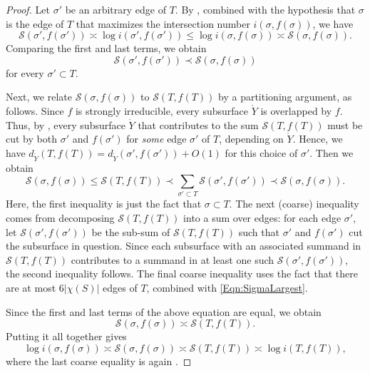 \documentclass[10pt,a4paper]{amsart}
\newcommand{\mc}{\mathcal}
\newcommand{\mr}{\mathring}
\begin{document}
\begin{proof}
Let $\sigma'$ be an arbitrary edge of $T$. By , combined with the hypothesis that $\sigma$ is the edge of $T$ that maximizes the intersection number $i(\sigma, f(\sigma))$, we have
\[
\mc S(\sigma', f(\sigma'))  \asymp  \log i(\sigma', f(\sigma')) \leq 
 \log i(\sigma, f(\sigma)) \asymp  \mc S(\sigma, f(\sigma)).
\]
Comparing the first and last terms, we obtain
\begin{equation}\label{Eqn:SigmaLargest}
\mc S(\sigma', f(\sigma')) \prec \mc S(\sigma, f(\sigma))
\end{equation}
for every $\sigma' \subset T$. 


Next, we relate $\mc S (\sigma, f(\sigma))$ to $\mc S(T, f(T))$ by a partitioning argument, as follows. 
Since $f$ is strongly irreducible, every subsurface $\mr Y$ is overlapped by $f$.
Thus, by  , 
every subsurface $\mr Y$ that contributes to the sum $\mc S(T, f(T))$ must be cut by both $\sigma'$ and $f(\sigma')$ for \emph{some} edge $\sigma'$ of $T$, depending on $\mr Y$. Hence, we have $d_{\mr Y}(T, f(T)) = d_{\mr Y}(\sigma', f(\sigma')) + O(1)$ for 
this choice of $\sigma'$.
Then we obtain
\[
\mc S(\sigma, f(\sigma)) \leq \mc S(T, f(T)) \prec \sum_{\sigma' \subset T} \mc S(\sigma', f(\sigma'))
\prec \mc S(\sigma, f(\sigma)).
\]
Here, the first inequality is just the fact that $\sigma \subset T$. The next (coarse) inequality comes from decomposing $\mc S(T, f(T))$ into a sum over edges: for each edge $\sigma'$, let $\mc S(\sigma', f(\sigma'))$ be the sub-sum of $\mc S(T, f(T))$ such that $\sigma'$ and $f(\sigma')$ cut the subsurface in question. Since each subsurface with an associated summand in $\mc S(T, f(T))$ contributes to a summand in at least one such $\mc S(\sigma', f(\sigma'))$, the second inequality follows. The final coarse inequality uses the fact that there are at most $6|\chi(S)|$ edges of $T$, 
combined with \eqref{Eqn:SigmaLargest}.

Since the first and last terms of the above equation are equal, we obtain
\[
\mc S(\sigma, f(\sigma)) \asymp \mc S(T, f(T)).
\]
Putting it all together gives
\[
\log i(\sigma, f(\sigma)) \asymp \mc S(\sigma, f(\sigma)) \asymp \mc S(T, f(T)) \asymp \log i(T, f(T)), 
\]
where the last coarse equality is again .
\end{proof}
\end{document}
